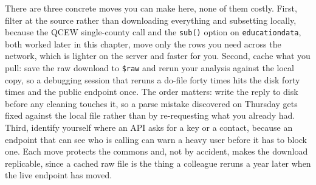 \documentclass[
    a4paper,
    fontsize=10pt,
    twoside=true,
    numbers=noenddot,
]{kaobook}
\begin{document}
There are three concrete moves you can make here, none of them costly. First, filter at the source rather than downloading everything and subsetting locally, because the QCEW single-county call and the \texttt{sub()} option on \texttt{educationdata}, both worked later in this chapter, move only the rows you need across the network, which is lighter on the server and faster for you. Second, cache what you pull: save the raw download to \texttt{\$raw} and rerun your analysis against the local copy, so a debugging session that reruns a do-file forty times hits the disk forty times and the public endpoint once. The order matters: write the reply to disk before any cleaning touches it, so a parse mistake discovered on Thursday gets fixed against the local file rather than by re-requesting what you already had. Third, identify yourself where an API asks for a key or a contact, because an endpoint that can see who is calling can warn a heavy user before it has to block one. Each move protects the commons and, not by accident, makes the download replicable, since a cached raw file is the thing a colleague reruns a year later when the live endpoint has moved.
\end{document}
